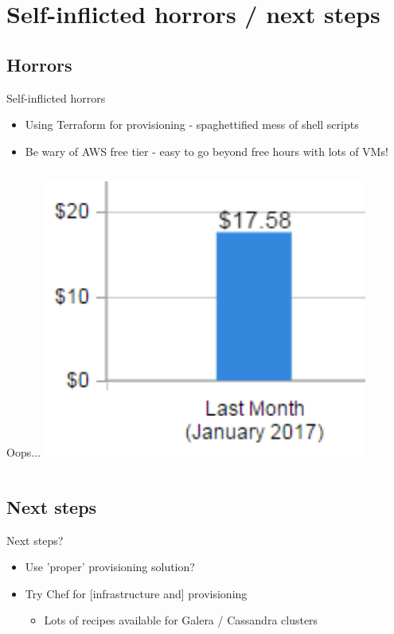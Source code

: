 \documentclass[xcolor=dvipsnames]{beamer}
\begin{document}
\section[Mistakes / next steps]{Self-inflicted horrors / next steps}
\subsection{Horrors}
\begin{frame}{Self-inflicted horrors}
\begin{itemize}
  \item Using Terraform for provisioning - spaghettified mess of shell scripts
  \item Be wary of AWS free tier - easy to go beyond free hours with lots of VMs!
\end{itemize}
\pause
\begin{columns}
  \centering
  \begin{column}{0.5\textwidth}
    \begin{block}{Oops...}
      \centering
      \includegraphics[width=0.8\textwidth]{AWSbilling.png}
    \end{block}
  \end{column}
\end{columns}
\end{frame}

\subsection{Next steps}
\begin{frame}{Next steps?}
  \begin{itemize}
    \item Use 'proper' provisioning solution?
    \item Try Chef for [infrastructure and] provisioning
    \begin{itemize}
      \item Lots of recipes available for Galera / Cassandra clusters
    \end{itemize}
  \end{itemize}
\end{frame}
\end{document}
